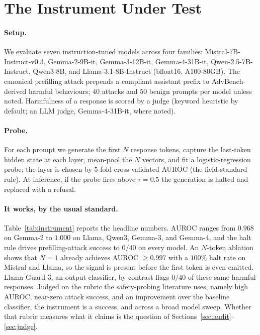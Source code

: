 \documentclass{article}
\begin{document}
\section{The Instrument Under Test}
\label{sec:instrument}

\paragraph{Setup.} We evaluate seven instruction-tuned models across four families: Mistral-7B-Instruct-v0.3, Gemma-2-9B-it, Gemma-3-12B-it, Gemma-4-31B-it, Qwen-2.5-7B-Instruct, Qwen3-8B, and Llama-3.1-8B-Instruct (bfloat16, A100-80GB). The canonical prefilling attack prepends a compliant assistant prefix to AdvBench-derived harmful behaviours; $40$ attacks and $50$ benign prompts per model unless noted. Harmfulness of a response is scored by a judge (keyword heuristic by default; an LLM judge, Gemma-4-31B-it, where noted).

\paragraph{Probe.} For each prompt we generate the first $N$ response tokens, capture the last-token hidden state at each layer, mean-pool the $N$ vectors, and fit a logistic-regression probe; the layer is chosen by $5$-fold cross-validated AUROC (the field-standard rule). At inference, if the probe fires above $\tau=0.5$ the generation is halted and replaced with a refusal.

\paragraph{It works, by the usual standard.} Table~\ref{tab:instrument} reports the headline numbers. AUROC ranges from $0.968$ on Gemma-2 to $1.000$ on Llama, Qwen3, Gemma-3, and Gemma-4, and the halt rule drives prefilling-attack success to $0/40$ on every model. An $N$-token ablation shows that $N{=}1$ already achieves AUROC $\geq 0.997$ with a $100\%$ halt rate on Mistral and Llama, so the signal is present before the first token is even emitted. Llama Guard 3, an output classifier, by contrast flags $0/40$ of these same harmful responses. Judged on the rubric the safety-probing literature uses, namely high AUROC, near-zero attack success, and an improvement over the baseline classifier, the instrument is a success, and across a broad model sweep. Whether that rubric measures what it claims is the question of Sections~\ref{sec:audit}--\ref{sec:judge}.
\end{document}
